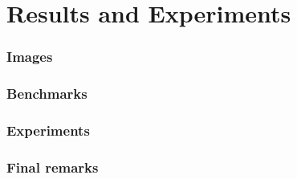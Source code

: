 
\part{Results and Experiments}

\section{Images}
\section{Benchmarks}
\section{Experiments}
\section{Final remarks}
